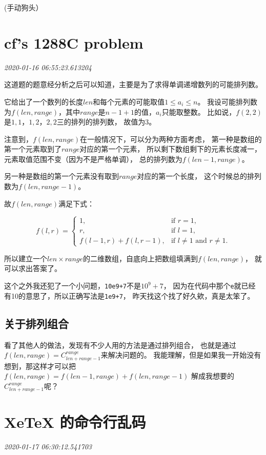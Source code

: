 \documentclass{peterlitsdoc}
\newcommand{\timetx}[1]
    {\par\noindent\emph{\pltgray\small #1}\vspace{2em}}
\newcommand{\vb}{\verb}
\begin{document}
(手动狗头）


\section{cf's 1288C problem}\timetx{2020-01-16 06:55:23.613204}

这道题的题意经分析之后可以知道，主要是为了求得单调递增数列的可能排列数。

它给出了一个数列的长度$len$和每个元素的可能取值$1\le a_i\le n$。
我设可能排列数为$f(len, range)$，其中$range$是$n-1+1$的值，$a_i$只能取整数。
比如说，$f(2, 2)$是${1, 1}$，${1, 2}$，${2, 2}$三的排列的排列数，
故值为3。

注意到，$f(len, range)$在一般情况下，可以分为两种方面考虑，
第一种是数组的第一个元素取到了$range$对应的第一个元素，
所以剩下数组剩下的元素长度减一，元素取值范围不变（因为不是严格单调），
总的排列数为$f(len-1, range)$。

另一种是数组的第一个元素没有取到$range$对应的第一个长度，
这个时候总的排列数为$f(len, range-1)$。

故$f(len, range)$满足下式：

\[f(l, r)=
\begin{cases}
    1, & \text{if } r=1, \\
    r, & \text{if } l=1,\\
    f(l-1, r) + f(l, r-1), & \text{if } l\ne 1 \text{ and } r\ne1.
\end{cases}\]

所以建立一个$len\times range$的二维数组，自底向上把数组填满到$f(len, range)$，
就可以求出答案了。

这个之外我还犯了一个小问题，\vb|10e9+7|不是$10^9+7$，
因为在代码中那个\vb|e|就已经有10的意思了，所以正确写法是\vb|1e9+7|，
昨天找这个找了好久欸，真是太笨了。

\subsection{关于排列组合}

看了其他人的做法，发现有不少人用的方法是通过排列组合，
也就是通过$f(len, range)=C_{len+range-1}^{range}$来解决问题的。
我能理解，但是如果我一开始没有想到，那这样才可以把
$f(len, range)=f(len-1, range) + f(len, range-1)$
解成我想要的$C_{len+range-1}^{range}$呢？


\section{XeTeX 的命令行乱码}\timetx{2020-01-17 06:30:12.541703}
\end{document}
